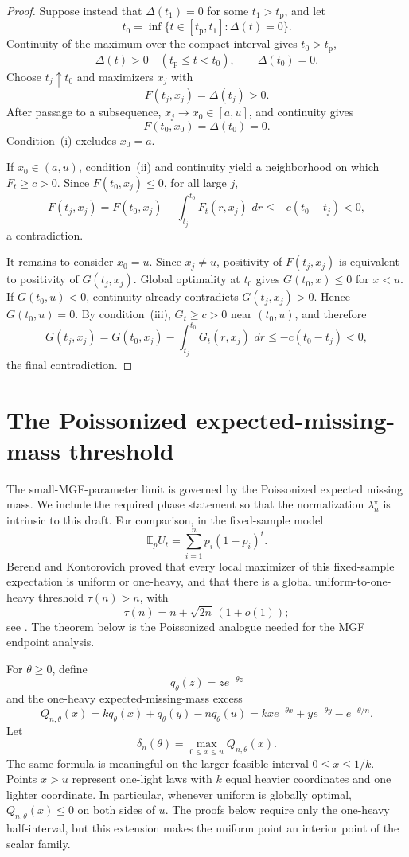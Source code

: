\documentclass[11pt]{article}
\theoremstyle{plain}
\theoremstyle{definition}
\theoremstyle{remark}
\newcommand{\E}{\mathbb E}
\newcommand{\dd}{\,d}
\begin{document}
\begin{proof}
Suppose instead that \(\Delta(t_1)=0\) for some \(t_1>t_{\mathrm p}\), and let
\[
t_0=\inf\{t\in[t_{\mathrm p},t_1]:\Delta(t)=0\}.
\]
Continuity of the maximum over the compact interval gives \(t_0>t_{\mathrm p}\),
\[
\Delta(t)>0\quad(t_{\mathrm p}\le t<t_0),
\qquad
\Delta(t_0)=0.
\]
Choose \(t_j\uparrow t_0\) and maximizers \(x_j\) with
\[
F(t_j,x_j)=\Delta(t_j)>0.
\]
After passage to a subsequence, \(x_j\to x_0\in[a,u]\), and continuity gives
\[
F(t_0,x_0)=\Delta(t_0)=0.
\]
Condition~\textup{(i)} excludes \(x_0=a\).

If \(x_0\in(a,u)\), condition~\textup{(ii)} and continuity yield a neighborhood on which \(F_t\ge c>0\).  Since \(F(t_0,x_j)\le0\), for all large \(j\),
\[
F(t_j,x_j)
=F(t_0,x_j)-\int_{t_j}^{t_0}F_t(r,x_j)\,\dd r
\le-c(t_0-t_j)<0,
\]
a contradiction.

It remains to consider \(x_0=u\).  Since \(x_j\ne u\), positivity of \(F(t_j,x_j)\) is equivalent to positivity of \(G(t_j,x_j)\).  Global optimality at \(t_0\) gives \(G(t_0,x)\le0\) for \(x<u\).  If \(G(t_0,u)<0\), continuity already contradicts \(G(t_j,x_j)>0\).  Hence \(G(t_0,u)=0\).  By condition~\textup{(iii)}, \(G_t\ge c>0\) near \((t_0,u)\), and therefore
\[
G(t_j,x_j)
=G(t_0,x_j)-\int_{t_j}^{t_0}G_t(r,x_j)\,\dd r
\le-c(t_0-t_j)<0,
\]
the final contradiction.
\end{proof}

\section{The Poissonized expected-missing-mass threshold}\label{sec:expected-threshold}

The small-MGF-parameter limit is governed by the Poissonized expected missing mass.  We include the required phase statement so that the normalization \(\lambda_n^\star\) is intrinsic to this draft.  For comparison, in the fixed-sample model
\[
\E_p U_t=\sum_{i=1}^n p_i(1-p_i)^t.
\]
Berend and Kontorovich proved that every local maximizer of this fixed-sample expectation is uniform or one-heavy, and that there is a global uniform-to-one-heavy threshold \(\tau(n)>n\), with
\[
\tau(n)=n+\sqrt{2n}\,(1+o(1));
\]
see \cite[Theorem~5]{BerendKontorovich2012}.  The theorem below is the Poissonized analogue needed for the MGF endpoint analysis.

For \(\theta\ge0\), define
\[
q_\theta(z)=z e^{-\theta z}
\]
and the one-heavy expected-missing-mass excess
\begin{equation}\label{eq:Q-def}
Q_{n,\theta}(x)=kq_\theta(x)+q_\theta(y)-nq_\theta(u)
=kx e^{-\theta x}+y e^{-\theta y}-e^{-\theta/n}.
\end{equation}
Let
\[
\delta_n(\theta)=\max_{0\le x\le u}Q_{n,\theta}(x).
\]
The same formula is meaningful on the larger feasible interval \(0\le x\le1/k\).  Points \(x>u\) represent one-light laws with \(k\) equal heavier coordinates and one lighter coordinate.  In particular, whenever uniform is globally optimal, \(Q_{n,\theta}(x)\le0\) on both sides of \(u\).  The proofs below require only the one-heavy half-interval, but this extension makes the uniform point an interior point of the scalar family.
\end{document}
